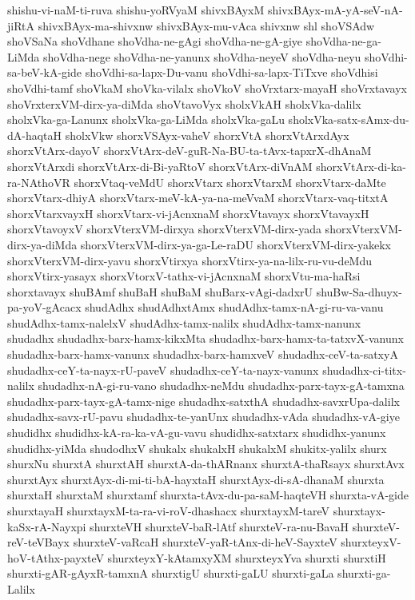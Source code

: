 {shishu-vi-naM-ti-ruva
shishu-yoRVyaM
shivxBAyxM
shivxBAyx-mA-yA-seV-nA-jiRtA
shivxBAyx-ma-shivxnw
shivxBAyx-mu-vAca
shivxnw
shl
shoVSAdw
shoVSaNa
shoVdhane
shoVdha-ne-gAgi
shoVdha-ne-gA-giye
shoVdha-ne-ga-LiMda
shoVdha-nege
shoVdha-ne-yanunx
shoVdha-neyeV
shoVdha-neyu
shoVdhi-sa-beV-kA-gide
shoVdhi-sa-lapx-Du-vanu
shoVdhi-sa-lapx-TiTxve
shoVdhisi
shoVdhi-tamf
shoVkaM
shoVka-vilalx
shoVkoV
shoVrxtarx-mayaH
shoVrxtavayx
shoVrxterxVM-dirx-ya-diMda
shoVtavoVyx
sholxVkAH
sholxVka-dalilx
sholxVka-ga-Lanunx
sholxVka-ga-LiMda
sholxVka-gaLu
sholxVka-satx-sAmx-du-dA-haqtaH
sholxVkw
shorxVSAyx-vaheV
shorxVtA
shorxVtArxdAyx
shorxVtArx-dayoV
shorxVtArx-deV-guR-Na-BU-ta-tAvx-tapxrX-dhAnaM
shorxVtArxdi
shorxVtArx-di-Bi-yaRtoV
shorxVtArx-diVnAM
shorxVtArx-di-ka-ra-NAthoVR
shorxVtaq-veMdU
shorxVtarx
shorxVtarxM
shorxVtarx-daMte
shorxVtarx-dhiyA
shorxVtarx-meV-kA-ya-na-meVvaM
shorxVtarx-vaq-titxtA
shorxVtarxvayxH
shorxVtarx-vi-jAcnxnaM
shorxVtavayx
shorxVtavayxH
shorxVtavoyxV
shorxVterxVM-dirxya
shorxVterxVM-dirx-yada
shorxVterxVM-dirx-ya-diMda
shorxVterxVM-dirx-ya-ga-Le-raDU
shorxVterxVM-dirx-yakekx
shorxVterxVM-dirx-yavu
shorxVtirxya
shorxVtirx-ya-na-lilx-ru-vu-deMdu
shorxVtirx-yasayx
shorxVtorxV-tathx-vi-jAcnxnaM
shorxVtu-ma-haRsi
shorxtavayx
shuBAmf
shuBaH
shuBaM
shuBarx-vAgi-dadxrU
shuBw-Sa-dhuyx-pa-yoV-gAcacx
shudAdhx
shudAdhxtAmx
shudAdhx-tamx-nA-gi-ru-va-vanu
shudAdhx-tamx-nalelxV
shudAdhx-tamx-nalilx
shudAdhx-tamx-nanunx
shudadhx
shudadhx-barx-hamx-kikxMta
shudadhx-barx-hamx-ta-tatxvX-vanunx
shudadhx-barx-hamx-vanunx
shudadhx-barx-hamxveV
shudadhx-ceV-ta-satxyA
shudadhx-ceY-ta-nayx-rU-paveV
shudadhx-ceY-ta-nayx-vanunx
shudadhx-ci-titx-nalilx
shudadhx-nA-gi-ru-vano
shudadhx-neMdu
shudadhx-parx-tayx-gA-tamxna
shudadhx-parx-tayx-gA-tamx-nige
shudadhx-satxthA
shudadhx-savxrUpa-dalilx
shudadhx-savx-rU-pavu
shudadhx-te-yanUnx
shudadhx-vAda
shudadhx-vA-giye
shudidhx
shudidhx-kA-ra-ka-vA-gu-vavu
shudidhx-satxtarx
shudidhx-yanunx
shudidhx-yiMda
shudodhxV
shukalx
shukalxH
shukalxM
shukitx-yalilx
shurx
shurxNu
shurxtA
shurxtAH
shurxtA-da-thARnanx
shurxtA-thaRsayx
shurxtAvx
shurxtAyx
shurxtAyx-di-mi-ti-bA-hayxtaH
shurxtAyx-di-sA-dhanaM
shurxta
shurxtaH
shurxtaM
shurxtamf
shurxta-tAvx-du-pa-saM-haqteVH
shurxta-vA-gide
shurxtayaH
shurxtayxM-ta-ra-vi-roV-dhashacx
shurxtayxM-tareV
shurxtayx-kaSx-rA-Nayxpi
shurxteVH
shurxteV-baR-lAtf
shurxteV-ra-nu-BavaH
shurxteV-reV-teVBayx
shurxteV-vaRcaH
shurxteV-yaR-tAnx-di-heV-SayxteV
shurxteyxV-hoV-tAthx-payxteV
shurxteyxY-kAtamxyXM
shurxteyxYva
shurxti
shurxtiH
shurxti-gAR-gAyxR-tamxnA
shurxtigU
shurxti-gaLU
shurxti-gaLa
shurxti-ga-Lalilx
}
